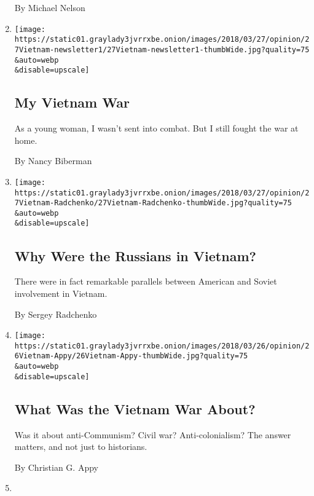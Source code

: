 \begin{enumerate}
  By Michael Nelson
\item
  \href{/2018/03/27/opinion/my-vietnam-war.html}{}

  \texttt{[image: https://static01.graylady3jvrrxbe.onion/images/2018/03/27/opinion/27Vietnam-newsletter1/27Vietnam-newsletter1-thumbWide.jpg?quality=75\\\&auto=webp\\\&disable=upscale]}

  \hypertarget{my-vietnam-war}{%
  \subsection{My Vietnam War}\label{my-vietnam-war}}

  As a young woman, I wasn't sent into combat. But I still fought the
  war at home.

  By Nancy Biberman
\item
  \href{/2018/03/27/opinion/russians-vietnam-war.html}{}

  \texttt{[image: https://static01.graylady3jvrrxbe.onion/images/2018/03/27/opinion/27Vietnam-Radchenko/27Vietnam-Radchenko-thumbWide.jpg?quality=75\\\&auto=webp\\\&disable=upscale]}

  \hypertarget{why-were-the-russians-in-vietnam}{%
  \subsection{Why Were the Russians in
  Vietnam?}\label{why-were-the-russians-in-vietnam}}

  There were in fact remarkable parallels between American and Soviet
  involvement in Vietnam.

  By Sergey Radchenko
\item
  \href{/2018/03/26/opinion/what-was-the-vietnam-war-about.html}{}

  \texttt{[image: https://static01.graylady3jvrrxbe.onion/images/2018/03/26/opinion/26Vietnam-Appy/26Vietnam-Appy-thumbWide.jpg?quality=75\\\&auto=webp\\\&disable=upscale]}

  \hypertarget{what-was-the-vietnam-war-about}{%
  \subsection{What Was the Vietnam War
  About?}\label{what-was-the-vietnam-war-about}}

  Was it about anti-Communism? Civil war? Anti-colonialism? The answer
  matters, and not just to historians.

  By Christian G. Appy
\item
  \href{/2018/03/24/opinion/lyndon-johnson-vietnam.html}{}


\end{enumerate}
